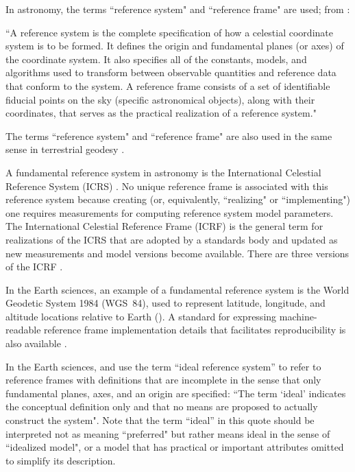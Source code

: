 \documentclass[draft]{agujournal2019}
\begin{document}

In astronomy, the terms ``reference system" and ``reference frame" are used; from :

``A reference system is the complete specification of how a celestial coordinate system is to be formed. It defines the origin and fundamental planes (or axes) of the coordinate system. It also specifies all of the constants, models, and algorithms used to transform between observable quantities and reference data that conform to the system. A reference frame consists of a set of identifiable fiducial points on the sky (specific astronomical objects), along with their coordinates, that serves as the practical realization of a reference system."

The terms ``reference system" and ``reference frame" are also used in the same sense in terrestrial geodesy \cite{Seitz2014}.

A fundamental reference system in astronomy is the International Celestial Reference System (ICRS) \cite{Petit2010}. No unique reference frame is associated with this reference system because creating (or, equivalently, ``realizing" or ``implementing") one requires measurements for computing reference system model parameters. The International Celestial Reference Frame (ICRF) is the general term for realizations of the ICRS that are adopted by a standards body and updated as new measurements and model versions become available. There are three versions of the ICRF \cite{Charlot2020}. 

In the Earth sciences, an example of a fundamental reference system is the World Geodetic System 1984 (WGS~84), used to represent latitude, longitude, and altitude locations relative to Earth (). A standard for expressing machine-readable reference frame implementation details that facilitates reproducibility is also available \cite{OGC2023}.

In the Earth sciences,  and  use the term ``ideal reference system'' to refer to reference frames with definitions that are incomplete in the sense that only fundamental planes, axes, and an origin are specified: ``The term `ideal' indicates the conceptual definition only and that no means are proposed to actually construct the system". Note that the term ``ideal'' in this quote should be interpreted not as meaning ``preferred" but rather means ideal in the sense of ``idealized model", or a model that has practical or important attributes omitted to simplify its description.
\end{document}
